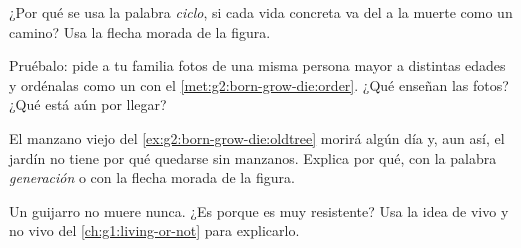 \begin{exercise}[$\star$]\label{exo:g2:born-grow-die:7}
¿Por qué se usa la palabra \emph{ciclo}, si cada vida concreta va del
 a la muerte como un camino? Usa la flecha morada de la figura.
\end{exercise}

\begin{exercise}[$\star$]\label{exo:g2:born-grow-die:8}
Pruébalo: pide a tu familia fotos de una misma persona mayor a
distintas edades y ordénalas como un  con el
\cref{met:g2:born-grow-die:order}. ¿Qué  enseñan las fotos? ¿Qué
 está aún por llegar?
\end{exercise}

\begin{exercise}[$\star\star$]\label{exo:g2:born-grow-die:9}
El manzano viejo del \cref{ex:g2:born-grow-die:oldtree} morirá algún
día y, aun así, el jardín no tiene por qué quedarse sin manzanos.
Explica por qué, con la palabra \emph{generación} o con la flecha
morada de la figura.
\end{exercise}

\begin{exercise}[$\star\star$]\label{exo:g2:born-grow-die:10}
Un guijarro no muere nunca. ¿Es porque es muy resistente? Usa la idea
de vivo y no vivo del \cref{ch:g1:living-or-not} para explicarlo.
\end{exercise}

